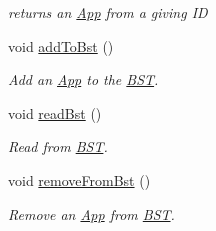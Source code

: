 \begin{DoxyCompactItemize}
\begin{DoxyCompactList}\small\item\em returns an \hyperlink{class_app}{App} from a giving I\-D \end{DoxyCompactList}\item 
void \hyperlink{class_app_store_aae1dc16347736d0021eade0569413ebe}{add\-To\-Bst} ()
\begin{DoxyCompactList}\small\item\em Add an \hyperlink{class_app}{App} to the \hyperlink{class_b_s_t}{B\-S\-T}. \end{DoxyCompactList}\item 
void \hyperlink{class_app_store_a0fdb4b829a446323909e0bfb61ec777b}{read\-Bst} ()
\begin{DoxyCompactList}\small\item\em Read from \hyperlink{class_b_s_t}{B\-S\-T}. \end{DoxyCompactList}\item 
void \hyperlink{class_app_store_a4218351acb8e17bb360f12e6415a557b}{remove\-From\-Bst} ()
\begin{DoxyCompactList}\small\item\em Remove an \hyperlink{class_app}{App} from \hyperlink{class_b_s_t}{B\-S\-T}. \end{DoxyCompactList}\end{DoxyCompactItemize}
